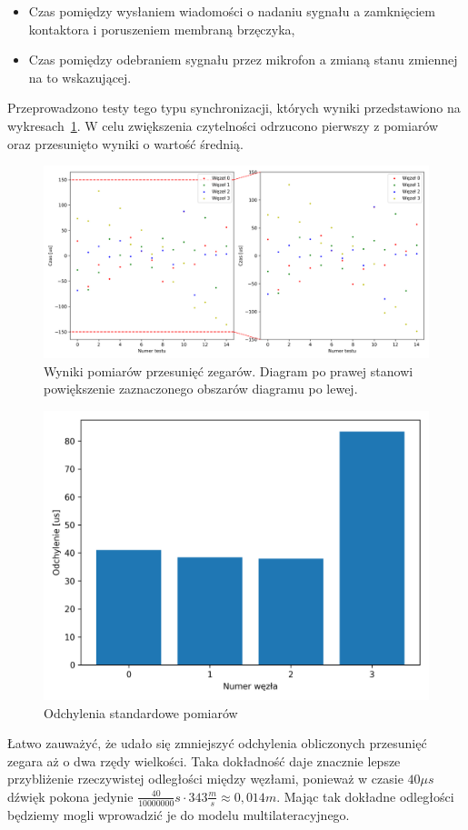 \begin{itemize}
    \item Czas pomiędzy wysłaniem wiadomości o nadaniu sygnału a zamknięciem kontaktora i poruszeniem membraną brzęczyka,
    \item Czas pomiędzy odebraniem sygnału przez mikrofon a zmianą stanu zmiennej na to wskazującej.
\end{itemize}

Przeprowadzono testy tego typu synchronizacji, których wyniki przedstawiono na wykresach~\ref{pic:mic_sync}. W celu zwiększenia czytelności odrzucono pierwszy z pomiarów oraz przesunięto wyniki o wartość średnią.

\begin{figure}[H]
    \centering
    \includegraphics[width=\textwidth]{pics/mic_sync/offsets.png}
    \caption{Wyniki pomiarów przesunięć zegarów.  Diagram po prawej stanowi powiększenie zaznaczonego obszarów diagramu po lewej.}
    \label{pic:mic_sync}
\end{figure}

\begin{figure}[H]
    \centering
    \includegraphics[width=.49\textwidth]{pics/mic_sync/stddev_offsets.png}
    \caption{Odchylenia standardowe pomiarów}
    \label{pic:stddev_mic}
\end{figure}

Łatwo zauważyć, że udało się zmniejszyć odchylenia obliczonych przesunięć zegara aż o dwa rzędy wielkości. Taka dokładność daje znacznie lepsze przybliżenie rzeczywistej odległości między węzłami, ponieważ w czasie $40 \mu s$ dźwięk pokona jedynie $\frac{40}{10000000}s \cdot 343 \frac{m}{s} \approx 0,014m$. Mając tak dokładne odległości będziemy mogli wprowadzić je do modelu multilateracyjnego.

